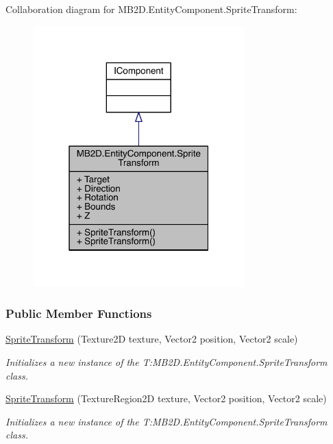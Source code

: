Collaboration diagram for M\+B2\+D.\+Entity\+Component.\+Sprite\+Transform\+:
\nopagebreak
\begin{figure}[H]
\begin{center}
\leavevmode
\includegraphics[width=232pt]{class_m_b2_d_1_1_entity_component_1_1_sprite_transform__coll__graph}
\end{center}
\end{figure}
\subsubsection*{Public Member Functions}
\begin{DoxyCompactItemize}
\item 
\hyperlink{class_m_b2_d_1_1_entity_component_1_1_sprite_transform_a76c00772a0190f598f50e13f160ea6ca}{Sprite\+Transform} (Texture2D texture, Vector2 position, Vector2 scale)
\begin{DoxyCompactList}\small\item\em Initializes a new instance of the T\+:\+M\+B2\+D.\+Entity\+Component.\+Sprite\+Transform class. \end{DoxyCompactList}\item 
\hyperlink{class_m_b2_d_1_1_entity_component_1_1_sprite_transform_a4d58f27164fa424eb839e74be97e238c}{Sprite\+Transform} (Texture\+Region2D texture, Vector2 position, Vector2 scale)
\begin{DoxyCompactList}\small\item\em Initializes a new instance of the T\+:\+M\+B2\+D.\+Entity\+Component.\+Sprite\+Transform class. \end{DoxyCompactList}\end{DoxyCompactItemize}
